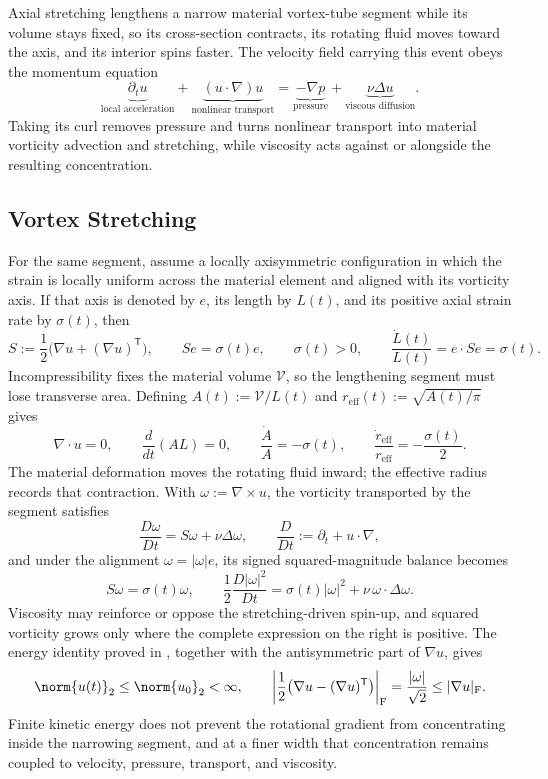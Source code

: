 
Axial stretching lengthens a narrow material vortex-tube segment while its volume stays fixed, so its cross-section contracts, its rotating fluid moves toward the axis, and its interior spins faster. The velocity field carrying this event obeys the momentum equation
\[
  \underbrace{\partial_t u}_{\text{local acceleration}}
  +
  \underbrace{(u\cdot\nabla)u}_{\text{nonlinear transport}}
  =
  \underbrace{-\nabla p}_{\text{pressure}}
  +
  \underbrace{\nu\Delta u}_{\text{viscous diffusion}}.
\]
Taking its curl removes pressure and turns nonlinear transport into material vorticity advection and stretching, while viscosity acts against or alongside the resulting concentration.

\subsection{Vortex Stretching}\label{sub:ThePerfectlyStretchingVortex}

For the same segment, assume a locally axisymmetric configuration in which the strain is locally uniform across the material element and aligned with its vorticity axis. If that axis is denoted by \(e\), its length by \(L(t)\), and its positive axial strain rate by \(\sigma(t)\), then
\[
  S:=\frac12\bigl(\nabla u+(\nabla u)^{\mathsf T}\bigr),
  \qquad
  Se=\sigma(t)e,
  \qquad
  \sigma(t)>0,
  \qquad
  \frac{\dot L(t)}{L(t)}
  =
  e\cdot Se
  =
  \sigma(t).
\]
Incompressibility fixes the material volume \(\mathcal V\), so the lengthening segment must lose transverse area. Defining \(A(t):=\mathcal V/L(t)\) and \(r_{\mathrm{eff}}(t):=\sqrt{A(t)/\pi}\) gives
\[
  \nabla\cdot u=0,
  \qquad
  \frac{d}{dt}(A L)=0,
  \qquad
  \frac{\dot A}{A}=-\sigma(t),
  \qquad
  \frac{\dot r_{\mathrm{eff}}}{r_{\mathrm{eff}}}
  =
  -\frac{\sigma(t)}{2}.
\]
The material deformation moves the rotating fluid inward; the effective radius records that contraction. With \(\omega:=\nabla\times u\), the vorticity transported by the segment satisfies
\[
  \frac{D\omega}{Dt}
  =
  S\omega+\nu\Delta\omega,
  \qquad
  \frac{D}{Dt}
  :=
  \partial_t+u\cdot\nabla,
\]
and under the alignment \(\omega=|\omega|e\), its signed squared-magnitude balance becomes
\[
  S\omega
  =
  \sigma(t)\omega,
  \qquad
  \frac12\frac{D|\omega|^2}{Dt}
  =
  \sigma(t)|\omega|^2
  +
  \nu\,\omega\cdot\Delta\omega.
\]
Viscosity may reinforce or oppose the stretching-driven spin-up, and squared vorticity grows only where the complete expression on the right is positive. The energy identity proved in , together with the antisymmetric part of \(\nabla u\), gives
\[
  \norm{u(t)}_2
  \leq
  \norm{u_0}_2
  <\infty,
  \qquad
  \left|\frac12\bigl(\nabla u-(\nabla u)^{\mathsf T}\bigr)\right|_{\mathrm F}
  =
  \frac{|\omega|}{\sqrt2}
  \leq
  |\nabla u|_{\mathrm F}.
\]
Finite kinetic energy does not prevent the rotational gradient from concentrating inside the narrowing segment, and at a finer width that concentration remains coupled to velocity, pressure, transport, and viscosity.

